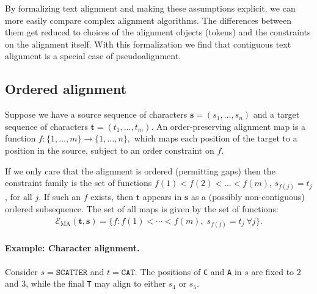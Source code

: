 By formalizing text alignment and making these assumptions explicit, we can more easily compare complex alignment algorithms. The differences between them get reduced to choices of the alignment objects (tokens) and the constraints on the alignment itself. With this formalization we find that contiguous text alignment is a special case of pseudoalignment.

\subsection{Ordered alignment}
Suppose we have a source sequence of characters  $\mathbf{s} = (s_1,\dots,s_n)$ and a target sequence of characters $\mathbf{t} = (t_1,\dots,t_m)$. An order-preserving alignment map is a function $f : \{1,\dots,m\} \to \{1,\dots,n\},$ which maps each position of the target to a position in the source, subject to an order constraint on $f$. 

If we only care that the alignment is ordered (permitting gaps) then the constraint family is the set of functions $f(1) < f(2) < \dots < f(m)$, $s_{f(j)} = t_j$, $ \text{for all } j.$ If such an $f$ exists, then $\mathbf{t}$ appears in $\mathbf{s}$ as a (possibly non-contiguous) ordered subsequence.  
The set of all maps is given by the set of functions:
\begin{align}
\mathcal{E}_{\mathrm{MA}}(\mathbf{t},\mathbf{s}) = \big\{ f : f(1)<\cdots<f(m),\; s_{f(j)} = t_j\ \forall j \big\}.
\end{align}


\paragraph{Example: Character alignment.}
Consider $s=\texttt{SCATTER}$ and $t=\texttt{CAT}$. The positions of \texttt{C} and \texttt{A} in $s$ are fixed to $2$ and $3$, while the final \texttt{T} may align to either $s_4$ or $s_5$.

